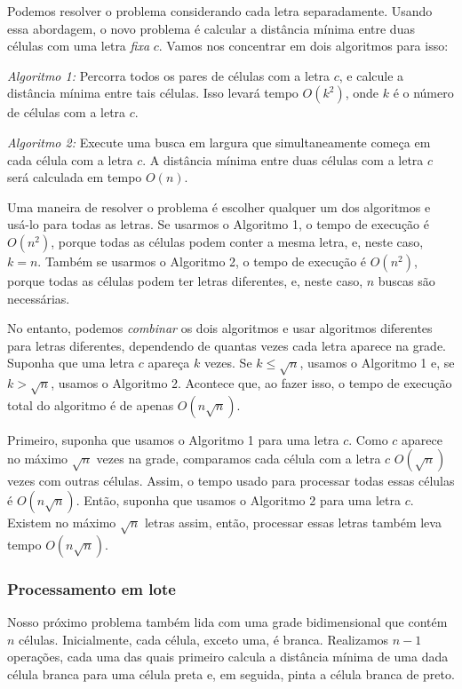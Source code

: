Podemos resolver o problema considerando cada letra separadamente.
Usando essa abordagem, o novo problema é calcular
a distância mínima
entre duas células com uma letra \emph{fixa} $c$.
Vamos nos concentrar em dois algoritmos para isso:

\emph{Algoritmo 1:} Percorra todos os pares de células com a letra $c$,
e calcule a distância mínima entre tais células.
Isso levará tempo $O(k^2)$, onde $k$ é o número de células com a letra $c$.

\emph{Algoritmo 2:} Execute uma busca em largura que simultaneamente
começa em cada célula com a letra $c$. A distância mínima entre
duas células com a letra $c$ será calculada em tempo $O(n)$.

Uma maneira de resolver o problema é escolher qualquer um dos
algoritmos e usá-lo para todas as letras.
Se usarmos o Algoritmo 1, o tempo de execução é $O(n^2)$,
porque todas as células podem conter a mesma letra,
e, neste caso, $k=n$.
Também se usarmos o Algoritmo 2, o tempo de execução é $O(n^2)$,
porque todas as células podem ter letras diferentes,
e, neste caso, $n$ buscas são necessárias.

No entanto, podemos \emph{combinar} os dois algoritmos e
usar algoritmos diferentes para letras diferentes,
dependendo de quantas vezes cada letra aparece na grade.
Suponha que uma letra $c$ apareça $k$ vezes.
Se $k \le \sqrt n$, usamos o Algoritmo 1 e, se $k > \sqrt n$,
usamos o Algoritmo 2.
Acontece que, ao fazer isso, o tempo de execução total
do algoritmo é de apenas $O(n \sqrt n)$.

Primeiro, suponha que usamos o Algoritmo 1 para uma letra $c$.
Como $c$ aparece no máximo $\sqrt n$ vezes na grade,
comparamos cada célula com a letra $c$ $O(\sqrt n)$ vezes
com outras células.
Assim, o tempo usado para processar todas essas células é $O(n \sqrt n)$.
Então, suponha que usamos o Algoritmo 2 para uma letra $c$.
Existem no máximo $\sqrt n$ letras assim,
então, processar essas letras também leva tempo $O(n \sqrt n)$.

\subsubsection{Processamento em lote}

Nosso próximo problema também lida com
uma grade bidimensional que contém $n$ células.
Inicialmente, cada célula, exceto uma, é branca.
Realizamos $n-1$ operações, cada uma das quais primeiro
calcula a distância mínima de uma dada célula branca
para uma célula preta e, em seguida, pinta a célula branca de preto.

